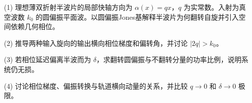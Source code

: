 (1) 理想薄双折射半波片的局部快轴方向为 \(\alpha(x)=qx\)，\(q\) 为实常数。入射为真空波数 \(k_0\) 的圆偏振平面波。以圆偏振Jones基解释半波片为何翻转自旋并引入空间依赖几何相位。

(2) 推导两种输入旋向的输出横向相位梯度和偏转角，并讨论 \(|2q|>k_0\)。

(3) 若相位延迟偏离半波而为 \(\delta\)，求翻转圆偏振与不翻转分量的功率比例，说明系统仍无损。

(4) 讨论相位梯度、偏振转换与轨道横向动量的关系，并比较 \(q\to0\) 和 \(\delta\to0\) 极限。
